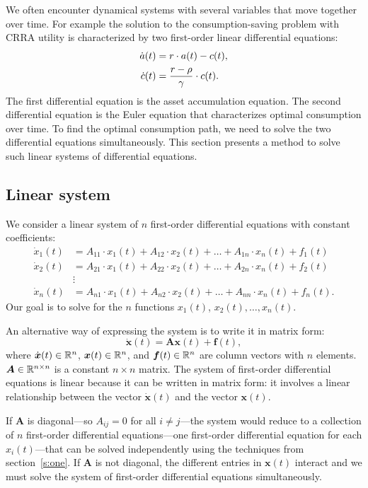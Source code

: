 \documentclass[letterpaper, 11pt, leqno]{article}
\begin{document}
We often encounter dynamical systems with several variables that move together over time. For example the solution to the consumption-saving problem with CRRA utility is characterized by two first-order linear differential equations:
\begin{align*}
\dot{a}(t) &=r\cdot a(t)-c(t), \\
\dot{c}(t) &=\frac{r-\rho}{\gamma}\cdot c(t).
\end{align*}
The first differential equation is the asset accumulation equation. The second differential equation is the Euler equation that characterizes optimal consumption over time. To find the optimal consumption path, we need to solve the two differential equations simultaneously. This section presents a method to solve such linear systems of differential equations.

\subsection{Linear system}

We consider a linear system of $n$ first-order differential equations with constant coefficients:
\begin{align*}
\dot{x}_{1}(t) &=A_{11}\cdot x_{1}(t)+A_{12}\cdot x_{2}(t)+\dots+A_{1n}\cdot x_{n}(t) +f_{1}(t) \\
\dot{x}_{2}(t) &=A_{21}\cdot x_{1}(t)+A_{22}\cdot x_{2}(t)+\dots+A_{2n}\cdot x_{n}(t) +f_{2}(t) \\
&\vdots\\
\dot{x}_{n}(t) &=A_{n1}\cdot x_{1}(t)+A_{n2}\cdot x_{2}(t)+\dots+A_{nn}\cdot x_{n}(t) +f_{n}(t).
\end{align*}
Our goal is to solve for the $n$ functions $x_{1}(t)$, $x_{2}(t),\dots, x_{n}(t)$.

An alternative way of expressing the system is to write it in matrix form:
\begin{equation}
\dot{\bm{x}}(t) = \bm{A} \bm{x}(t) +\bm{f}(t), 
\label{e:FODEsys}\end{equation}
where $\dot{\bm{x}}(t) \in \mathbb{R}^{n}$, $\bm{x}(t) \in \mathbb{R}^{n}$, and $\bm{f}(t) \in \mathbb{R}^{n}$ are column vectors with $n$ elements. $\bm{A}\in \mathbb{R}^{n\times n}$ is a constant $n\times n$ matrix. The system of first-order differential equations is linear because it can be written in matrix form: it involves a linear relationship between the vector $\dot{\bm{x}}(t)$ and the vector $\bm{x}(t)$.

If $\bm{A}$ is diagonal---so $A_{ij}=0$ for all $i\neq j$---the system would reduce to a collection of $n$ first-order differential equations---one first-order differential equation for each $x_{i}(t)$---that can be solved independently using the techniques from section~\ref{s:one}. If $\bm{A}$ is not diagonal, the different entries in $\bm{x}(t)$ interact and we must solve the system of first-order differential equations simultaneously.
\end{document}
